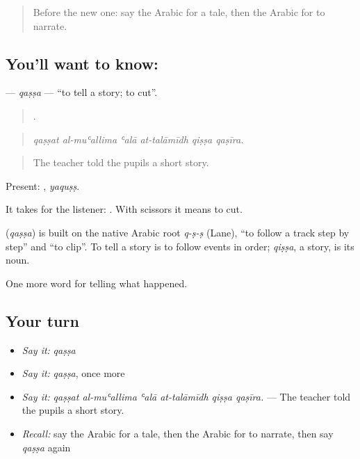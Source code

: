 \label{lesson:AR-C295-qassa}



\begin{quote}
Before the new one: say the Arabic for a tale, then the Arabic for to narrate.
\end{quote}

\subsection*{You'll want to know: }
\textbf{} — \emph{qaṣṣa} — \textquotedblleft{}to tell a story; to cut\textquotedblright{}.

\begin{quote}
     .
\end{quote}

\begin{quote}
\emph{qaṣṣat al-muʿallima ʿalā at-talāmīdh qiṣṣa qaṣīra.}
\end{quote}

\begin{quote}
The teacher told the pupils a short story.
\end{quote}

Present: , \emph{yaquṣṣ}.

It takes  for the listener:   . With scissors it means to cut.

\begin{cousinweb}
\textbf{} (\emph{qaṣṣa}) is built on the native Arabic root \emph{q-ṣ-ṣ} (Lane), \textquotedblleft{}to follow a track step by step\textquotedblright{} and \textquotedblleft{}to clip\textquotedblright{}. To tell a story is to follow events in order; \emph{qiṣṣa}, a story, is its noun.
\end{cousinweb}

\begin{grammarlens}[title={What you've built}]
One more word for telling what happened.
\end{grammarlens}

\subsection*{Your turn}
\begin{itemize}
\raggedright
  \item \emph{Say it:} \emph{qaṣṣa}
  \item \emph{Say it:} \emph{qaṣṣa}, once more
  \item \emph{Say it:} \emph{qaṣṣat al-muʿallima ʿalā at-talāmīdh qiṣṣa qaṣīra.} — The teacher told the pupils a short story.
  \item \emph{Recall:} say the Arabic for a tale, then the Arabic for to narrate, then say \emph{qaṣṣa} again
\end{itemize}

